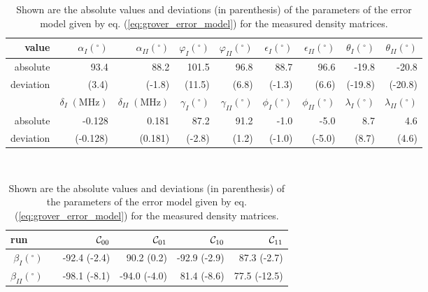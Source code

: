 \begin{table}[ht!]
\begin{tabular}{r|rrrrrrrr}
value & $\alpha_I (^\circ)$ & $\alpha_{II} (^\circ)$ & $\varphi_I (^\circ)$ & $\varphi_{II} (^\circ)$ & $\epsilon_I (^\circ)$ & $\epsilon_{II} (^\circ)$ & $\theta_{I} (^\circ)$ & $\theta_{II} (^\circ)$\\ \hline
absolute  & 93.4 & 88.2 & 101.5  &  96.8 & 88.7  & 96.6  & -19.8 & -20.8 \\
deviation  & (3.4) & (-1.8) & (11.5) & (6.8)  & (-1.3) & (6.6) & (-19.8) & (-20.8) \bigskip \\ 
& $\delta_I\;(\mathrm{MHz})$ & $\delta_{II}\;(\mathrm{MHz})$ & $\gamma_I (^\circ)$ & $\gamma_{II} (^\circ)$ & $\phi_I (^\circ)$ & $\phi_{II} (^\circ)$ & $\lambda_{I} (^\circ)$ & $\lambda_{II} (^\circ)$ \\ \hline
absolute & -0.128 & 0.181 & 87.2 & 91.2 & -1.0 & -5.0 & 8.7 & 4.6 \\
deviation & (-0.128) & (0.181) & (-2.8) & (1.2) & (-1.0) & (-5.0)  & (8.7) & (4.6)
\end{tabular} \bigskip \\ 
\begin{tabular}{p{1cm}r|rrrr}
run & & $\Or_{00}$ & $\Or_{01}$ & $\Or_{10}$ & $\Or_{11}$ \\ \hline
\multicolumn{1}{r}{$\beta_I (^\circ)$} & & -92.4 (-2.4) & 90.2 (0.2) & -92.9 (-2.9) & 87.3 (-2.7)   \\
\multicolumn{1}{r}{$\beta_{II} (^\circ)$} & & -98.1 (-8.1) & -94.0 (-4.0) & 81.4 (-8.6) & 77.5 (-12.5)  
\end{tabular}
\caption{Shown are the absolute values and deviations (in parenthesis) of the parameters of the error model given by eq. (\ref{eq:grover_error_model}) for the measured density matrices.}
\label{tab:grover_error_parameters}
\end{table}


